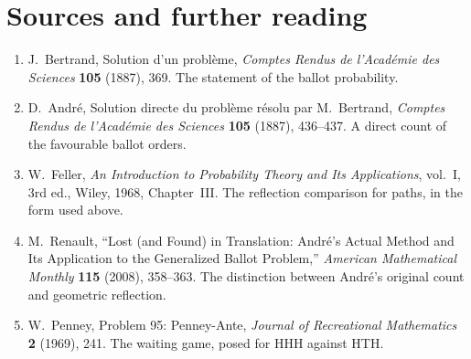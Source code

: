 \section*{Sources and further reading}

\begin{enumerate}
\item J.~Bertrand, Solution d'un probl\`eme, \emph{Comptes Rendus de l'Acad\'emie des Sciences} \textbf{105} (1887), 369. The statement of the ballot probability.
\item D.~Andr\'e, Solution directe du probl\`eme r\'esolu par M.~Bertrand, \emph{Comptes Rendus de l'Acad\'emie des Sciences} \textbf{105} (1887), 436--437. A direct count of the favourable ballot orders.
\item W.~Feller, \emph{An Introduction to Probability Theory and Its Applications}, vol.~I, 3rd ed., Wiley, 1968, Chapter~III. The reflection comparison for paths, in the form used above.
\item M.~Renault, ``Lost (and Found) in Translation: Andr\'e's Actual Method and Its Application to the Generalized Ballot Problem,'' \emph{American Mathematical Monthly} \textbf{115} (2008), 358--363. The distinction between Andr\'e's original count and geometric reflection.
\item W.~Penney, Problem 95: Penney-Ante, \emph{Journal of Recreational Mathematics} \textbf{2} (1969), 241. The waiting game, posed for HHH against HTH.
\end{enumerate}
